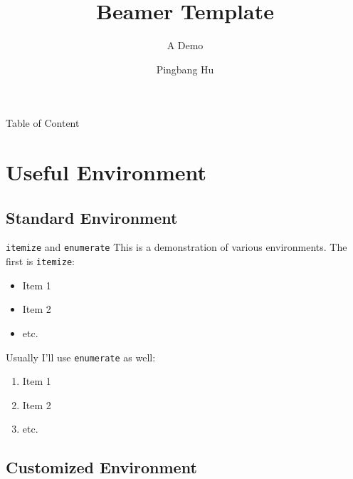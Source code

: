\documentclass[aspectratio=169]{beamer}
\title[\cite{HuLaTeXTemplate}]{Beamer Template}
\subtitle{A Demo}
\institute[UIUC]{University of Illinois Urbana-Champaign}
\author{Pingbang Hu}
\begin{document}
\begin{frame}
    \titlepage
\end{frame}

\begin{frame}{Table of Content}
    \tableofcontents[hideallsubsections]
\end{frame}


\section{Useful Environment}
\subsection{Standard Environment}
\begin{frame}{\texttt{itemize} and \texttt{enumerate}}
    This is a demonstration of various environments. The first is \texttt{itemize}:

    \begin{itemize}
        \item Item 1
        \item Item 2
        \item etc.
    \end{itemize}

    Usually I'll use \texttt{enumerate} as well:

    \begin{enumerate}
        \item Item 1
        \item Item 2
        \item etc.
    \end{enumerate}
\end{frame}

\subsection{Customized Environment}
\end{document}
